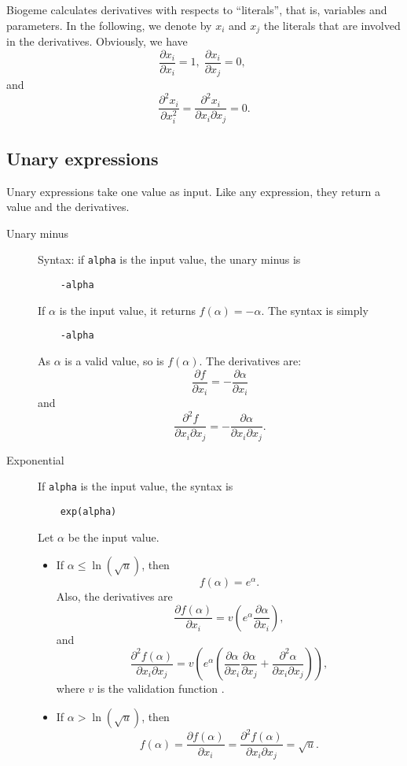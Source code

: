 \documentclass[12pt,a4paper]{article}
\begin{document}
Biogeme calculates derivatives with respects to ``literals'', that is, variables and parameters. In the following, we denote by $x_i$ and $x_j$ the literals that are involved in the derivatives.
Obviously, we have
\[
\frac{\partial x_i}{\partial x_i}=1, \;
\frac{\partial x_i}{\partial x_j}=0, \;
\]
and
\[
\frac{\partial^2 x_i}{\partial x_i^2}=\frac{\partial^2 x_i}{\partial x_i \partial x_j} = 0. 
\]


\subsection{Unary expressions}

Unary expressions take one value as input. Like any expression, they return a value and the derivatives.
\begin{description}
\item[Unary minus]
  Syntax: if \lstinline+alpha+ is the input value, the unary minus is
  \begin{lstlisting}
    -alpha
  \end{lstlisting}
  If $\alpha$ is the input value, it returns $f(\alpha)=-\alpha$. The syntax is simply
  \begin{lstlisting}
    -alpha
  \end{lstlisting}
  As $\alpha$ is a valid value, so is $f(\alpha)$. The derivatives are:
  \[
  \frac{\partial f}{\partial x_i} = - \frac{\partial \alpha}{\partial x_i}
  \]
  and
  \[
  \frac{\partial^2 f}{\partial x_i \partial x_j} = - \frac{\partial \alpha}{\partial x_i \partial x_j}.
  \]
\item[Exponential] If \lstinline+alpha+ is the input value, the syntax is
  \begin{lstlisting}
    exp(alpha)
  \end{lstlisting}
  Let $\alpha$ be the input value.
  \begin{itemize}
  \item  If $\alpha \leq \ln(\sqrt{u})$, then
    \[
    f(\alpha)=e^\alpha.
    \]
    Also, the derivatives are
    \[
    \frac{\partial f(\alpha)}{\partial x_i} = v\left(e^\alpha \frac{\partial \alpha}{\partial x_i}\right),
    \]
    and
    \[
    \frac{\partial^2 f(\alpha)}{\partial x_i \partial x_j} = v\left(e^\alpha (\frac{\partial \alpha}{\partial x_i}\frac{\partial \alpha}{\partial x_j} + \frac{\partial^2 \alpha}{\partial x_i \partial x_j})\right),
    \]
    where $v$ is the validation function .
  \item If $\alpha > \ln(\sqrt{u})$, then
    \[
    f(\alpha) = \frac{\partial f(\alpha)}{\partial x_i} = \frac{\partial^2 f(\alpha)}{\partial x_i \partial x_j} = \sqrt{u}.
    \]
  \end{itemize}


\end{description}
\end{document}
